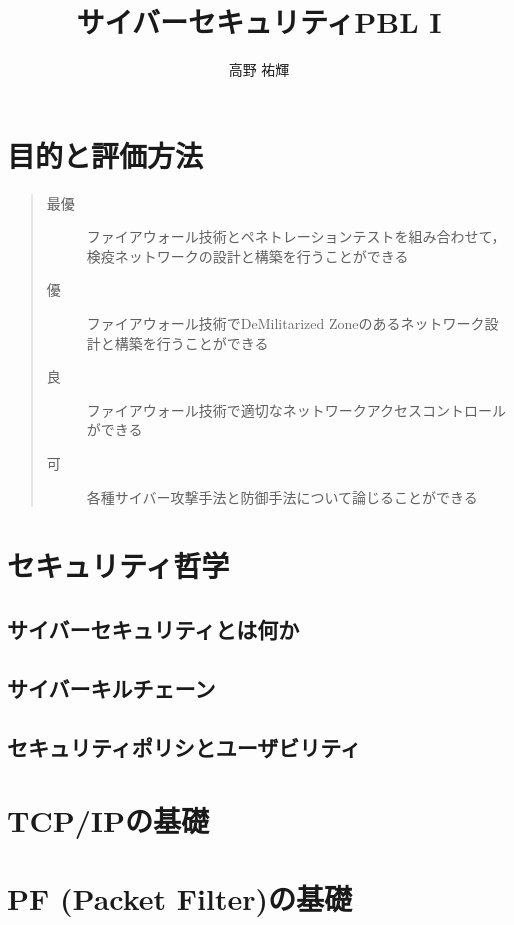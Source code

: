 \documentclass[fleqn]{jsarticle}
\title{サイバーセキュリティPBL I}
\author{高野 祐輝}
\begin{document}
\maketitle

\section{目的と評価方法}

\begin{quote}
\begin{description}
    \item[最優] ファイアウォール技術とペネトレーションテストを組み合わせて，検疫ネットワークの設計と構築を行うことができる
    \item[優] ファイアウォール技術でDeMilitarized Zoneのあるネットワーク設計と構築を行うことができる
    \item[良] ファイアウォール技術で適切なネットワークアクセスコントロールができる
    \item[可] 各種サイバー攻撃手法と防御手法について論じることができる
\end{description}
\end{quote}


\section{セキュリティ哲学}

\subsection{サイバーセキュリティとは何か}

\subsection{サイバーキルチェーン}

\cite{hutchins2011intelligence}

\subsection{セキュリティポリシとユーザビリティ}

\cite{RFC2196}

\section{TCP/IPの基礎} \label{sec:tcpip}


\section{PF (Packet Filter)の基礎}
\end{document}
